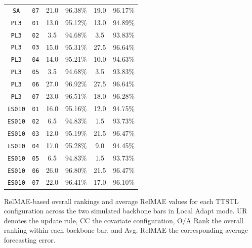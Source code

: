 \documentclass[10pt,a4paper,oneside]{article}
\providecommand{\DIFdeltex}[1]{{\protect\color{red} \scriptsize #1}} %
\providecommand{\DIFdelFL}[1]{\DIFdel{#1}} %
\providecommand{\DIFaddbeginFL}{} %
\providecommand{\DIFaddendFL}{} %
\providecommand{\DIFdelbeginFL}{} %
\providecommand{\DIFdelendFL}{} %
\providecommand{\DIFdel}[1]{\texorpdfstring{\DIFdeltex{#1}}{}} %
\newcommand{\DIFscaledelfig}{0.5}
\newlength{\DIFdelgraphicswidth} %
\newlength{\DIFdelgraphicsheight} %
\newcommand{\DIFaddincludegraphics}[2][]{{\color{blue}\fbox{\DIFOincludegraphics[#1]{#2}}}} %
\newcommand{\DIFdelincludegraphics}[2][]{%
\sbox{\DIFdelgraphicsbox}{\DIFOincludegraphics[#1]{#2}}%
\settoboxwidth{\DIFdelgraphicswidth}{\DIFdelgraphicsbox} %
\settoboxtotalheight{\DIFdelgraphicsheight}{\DIFdelgraphicsbox} %
\scalebox{\DIFscaledelfig}{%
\parbox[b]{\DIFdelgraphicswidth}{\usebox{\DIFdelgraphicsbox}\\[-\baselineskip] \rule{\DIFdelgraphicswidth}{0em}}\llap{\resizebox{\DIFdelgraphicswidth}{\DIFdelgraphicsheight}{%
\setlength{\unitlength}{\DIFdelgraphicswidth}%
\begin{picture}(1,1)%
\thicklines\linethickness{2pt} %
{\color[rgb]{1,0,0}\put(0,0){\framebox(1,1){}}}%
{\color[rgb]{1,0,0}\put(0,0){\line( 1,1){1}}}%
{\color[rgb]{1,0,0}\put(0,1){\line(1,-1){1}}}%
\end{picture}%
}\hspace*{3pt}}} %
} %
\DeclareRobustCommand{\DIFaddbeginFL}{\DIFOaddbeginFL \let\includegraphics\DIFaddincludegraphics} %
\DeclareRobustCommand{\DIFaddendFL}{\DIFOaddendFL \let\includegraphics\DIFOincludegraphics} %
\DeclareRobustCommand{\DIFdelbeginFL}{\DIFOdelbeginFL \let\includegraphics\DIFdelincludegraphics} %
\DeclareRobustCommand{\DIFdelendFL}{\DIFOaddendFL \let\includegraphics\DIFOincludegraphics} %
\begin{document}
\begin{table}[htb]
\begin{tabular}{@{}cccccc@{}}
        \verb|SA|    & \verb|07| & 21.0         & 96.38\%         & 19.0         & 96.17\%         \\
        \verb|PL3|   & \verb|01| & 13.0         & 95.12\%         & 13.0         & 94.89\%         \\
        \verb|PL3|   & \verb|02| & 3.5          & 94.68\%         & 3.5          & 93.83\%         \\
        \verb|PL3|   & \verb|03| & 15.0         & 95.31\%         & 27.5         & 96.64\%         \\
        \verb|PL3|   & \verb|04| & 14.0         & 95.21\%         & 10.0         & 94.63\%         \\
        \verb|PL3|   & \verb|05| & 3.5          & 94.68\%         & 3.5          & 93.83\%         \\
        \verb|PL3|   & \verb|06| & 27.0         & 96.92\%         & 27.5         & 96.64\%         \\
        \verb|PL3|   & \verb|07| & 23.0         & 96.51\%         & 18.0         & 96.28\%         \\
        \verb|ES010| & \verb|01| & 16.0         & 95.16\%         & 12.0         & 94.75\%         \\
        \verb|ES010| & \verb|02| & 6.5          & 94.83\%         & 1.5          & 93.73\%         \\
        \verb|ES010| & \verb|03| & 12.0         & 95.19\%         & 21.5         & 96.47\%         \\
        \verb|ES010| & \verb|04| & 17.0         & 95.28\%         & 9.0          & 94.45\%         \\
        \verb|ES010| & \verb|05| & 6.5          & 94.83\%         & 1.5          & 93.73\%         \\
        \verb|ES010| & \verb|06| & 26.0         & 96.80\%         & 21.5         & 96.47\%         \\
        \verb|ES010| & \verb|07| & 22.0         & 96.41\%         & 17.0         & 96.10\%         \\
        \bottomrule
    \end{tabular}
    \DIFdelbeginFL %
{%
\DIFdelFL{RelMAE-based overall rankings and average RelMAE values for each TTSTL configuration across the two simulated backbone bars in Local Adapt mode. UR denotes the update rule, CC the covariate configuration, O/A Rank the overall ranking within each backbone bar, and Avg. RelMAE the corresponding average forecasting error.}}
\DIFdelendFL \DIFaddbeginFL 

    
\DIFaddendFL \end{table}
\end{document}
